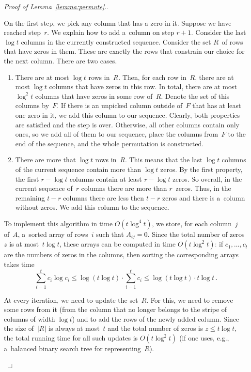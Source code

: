 \begin{proof}[Proof of Lemma~\ref{lemma:permute}.]
\begin{description}
On the first step, we pick any column that has a zero in it. Suppose
we have reached step~$r$. We explain how to add a~column on
step $r+1$. Consider the last $\log t$ columns in the currently
constructed sequence. Consider the set $R$~of rows that have
zeros in them. These are exactly the rows that constrain our
choice for the next column. There are two cases.
\begin{enumerate}
\item There are at most $\log t$ rows in~$R$. Then, for each row in~$R$, there are at most $\log t$ columns that have zeros in this row. In total, there are at most $\log^2 t$ columns that have zeros in some row of~$R$. Denote the set of this columns by~$F$. If there is an unpicked column outside of~$F$ that has at least one zero in it, we add this column to our sequence. Clearly, both properties are satisfied and the step is over. Otherwise, all other columns contain only ones, so we add all of them to our sequence, place the columns from~$F$ to the end of the sequence, and the whole permutation is constructed.
\item There are more that $\log t$ rows in~$R$. This means that the last $\log t$ columns of the current sequence contain more than $\log t$ zeros. By the first property, the first $r - \log t$ columns contain at least $r - \log t$ zeros. So overall, in the current sequence of~$r$ columns there are more than $r$~zeros. Thus, in the remaining $t-r$ columns there are less then $t-r$ zeros and there is a~column without zeros. We add this column to the sequence.
\end{enumerate}


To implement this algorithm in time $O(t\log^{4}t)$, we store, for each column~$j$ of~$A$, a~sorted array of rows~$i$ such that $A_{ij}=0$. Since the total number of zeros~$z$ is at most~$t\log t$, these arrays can be computed in time $O(t\log^2t)$: if $c_1, \dotsc, c_t$ are the numbers of zeros in the columns, then sorting the corresponding arrays takes time
\[\sum_{i=1}^{t}c_i \log c_i \le \log(t \log t) \cdot \sum_{i=1}^{t}c_i \le \log(t \log t) \cdot t\log t \, .\]

At every iteration, we need to update the set~$R$. For this, we need to remove some rows from it (from the column that no longer belongs to the stripe of columns of width $\log t$) and to add the rows of the newly added column. Since the size of~$|R|$ is always at most~$t$ and the total number of zeros is $z \le t\log t$, the total running time for all such updates is
$O(t\log^2t)$ (if one uses, e.g., a~balanced binary search tree for
representing~$R$).


\end{description}
\end{proof}
